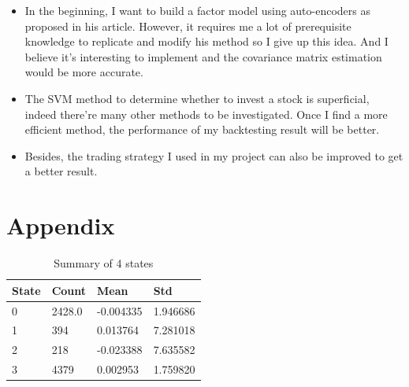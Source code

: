 \documentclass[a4paper,12pt]{article}
\begin{document}
\begin{itemize}
    \item In the beginning, I want to build a factor model using auto-encoders as \cite{gu_autoencoder_2021} proposed in his article. However, it requires me a lot of prerequisite knowledge to replicate and modify his method so I give up this idea. And I believe it's interesting to implement and the covariance matrix estimation would be more accurate.
    \item The SVM method to determine whether to invest a stock is superficial, indeed there're many other methods to be investigated. Once I find a more efficient method, the performance of my backtesting result will be better.
    \item Besides, the trading strategy I used in my project can also be improved to get a better result.
\end{itemize}

\section{Appendix}

\begin{table}[H]
    \centering
    \begin{tabular}{|l|l|l|l|}
    \hline
    State & Count  & Mean                           & Std                           \\ \hline
    0     & 2428.0 & -0.004335                      & \multicolumn{1}{r|}{1.946686} \\ \hline
    1     & 394    & 0.013764                       & 7.281018                      \\ \hline
    2     & 218    & \multicolumn{1}{r|}{-0.023388} & 7.635582                      \\ \hline
    3     & 4379   & 0.002953                       & \multicolumn{1}{r|}{1.759820} \\ \hline
    \end{tabular}
    \caption{Summary of 4 states}
    \label{table_4states}
\end{table}




\end{document}
